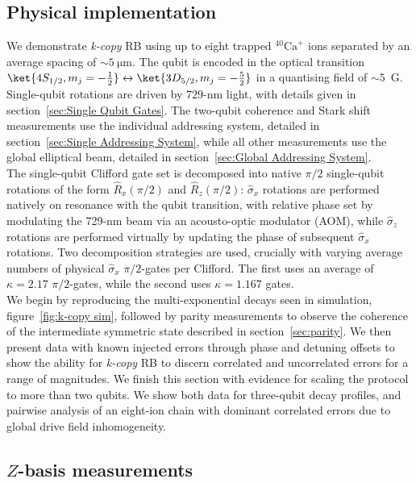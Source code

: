\subsection{Physical implementation}
We demonstrate \emph{k-copy} RB using up to eight
trapped $^{40}\text{Ca}^+$ ions separated by an average spacing of
$\sim5~\unit{\micro\meter}$.  The qubit is encoded in the optical transition
$\ket{4S_{1/2},m_j=-\frac{1}{2}}\leftrightarrow\ket{3D_{5/2},m_j=-\frac{5}{2}}$
in a quantising field of $\sim5$~G. Single-qubit rotations are driven by
$729$-$\unit{\nano\meter}$ light, with details given in section~\ref{sec:Single
Qubit Gates}.
The two-qubit coherence and Stark shift measurements use the
individual addressing system, detailed in section~\ref{sec:Single Addressing
System}, while all other measurements use the global elliptical beam, detailed
in section~\ref{sec:Global Addressing System}.\\
The single-qubit Clifford gate set is
decomposed into native $\pi/2$ single-qubit rotations of the form
$\hat R_x(\pi/2)$ and $\hat R_z(\pi/2)$: $\hat\sigma_x$ rotations are
performed natively on resonance with the qubit transition, with relative
phase set by modulating the 729-nm beam via an
acousto-optic modulator (AOM), while $\hat\sigma_z$ rotations are performed
virtually by updating the phase of subsequent $\hat\sigma_x$ rotations. Two decomposition strategies are used, crucially with varying average numbers of physical $\hat\sigma_x$ $\pi/2$-gates per Clifford. The first uses an average of $\kappa=2.17$ $\pi/2$-gates, while the second uses $\kappa=1.167$ gates.\\
We begin by reproducing the multi-exponential decays seen in simulation, figure~\ref{fig:k-copy sim}, followed by parity measurements to observe the coherence of the intermediate symmetric state described in section~\ref{sec:parity}. We then present data with known injected errors through phase and detuning offsets to show the ability for \emph{k-copy} RB to discern correlated and uncorrelated errors for a range of magnitudes. We finish this section with evidence for scaling the protocol to more than two qubits. We show both data for three-qubit decay profiles, and pairwise analysis of an eight-ion chain with dominant correlated errors due to global drive field inhomogeneity.


\subsection{$Z$-basis measurements}
\label{sec:k-copy_exp_Z}

